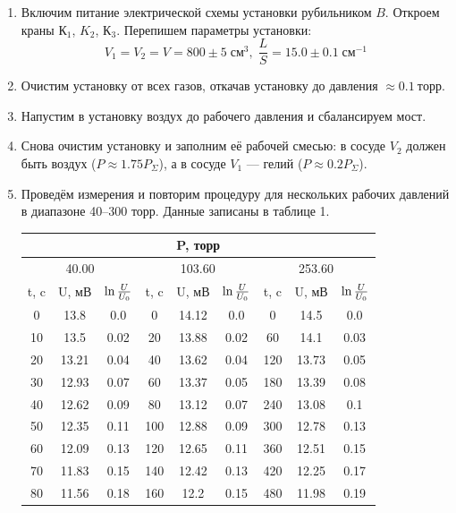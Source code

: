 \documentclass[12pt,a4paper]{article}
\begin{document}
\begin{enumerate}
\item Включим питание электрической схемы установки рубильником $B$. Откроем краны $К_1$, $K_2$, $К_3$. Перепишем параметры установки: $$V_1 = V_2 = V = 800 \pm 5 \; см^{3}, \; \frac{L}{S} = 15.0 \pm 0.1 \;см^{-1}$$
\item Очистим установку от всех газов, откачав установку до давления $\approx 0.1\ торр $.
\item Напустим в установку воздух до рабочего давления и сбалансируем мост. 
\item Снова очистим установку и заполним её рабочей смесью: в сосуде $V_2$ должен быть воздух ($P \approx 1.75P_\Sigma$), а в сосуде $V_1$ — гелий ($P \approx 0.2 P_\Sigma$).
\item Проведём измерения и повторим процедуру для нескольких рабочих давлений в диапазоне 40--300 торр. Данные записаны в таблице 1.
\begin{table}[htp]
	\centering
	\begin{tabular}{|c|c|c||c|c|c||c|c|c|}
		\hline
		\multicolumn{9}{|c|}{P, торр}\\
		\hline
		\multicolumn{3}{|c||}{40.00} & \multicolumn{3}{|c||}{103.60} & \multicolumn{3}{|c|}{253.60}\\
		\hline
		t, c & U, мВ&$\ln{U\over U_0}$&t, c & U, мВ&$\ln{U\over U_0}$&t, c & U, мВ&$\ln{U\over U_0}$\\
		\hline
		0  &  13.8  &  0.0  &  0  &  14.12  &  0.0  &  0  &  14.5  &  0.0 \\ 
		\hline
	   10  &  13.5  &  0.02  &  20  &  13.88  &  0.02  &  60  &  14.1  &  0.03 \\ 
		\hline
	   20  &  13.21  &  0.04  &  40  &  13.62  &  0.04  &  120  &  13.73  &  0.05 \\ 
		\hline
	   30  &  12.93  &  0.07  &  60  &  13.37  &  0.05  &  180  &  13.39  &  0.08 \\ 
		\hline
	   40  &  12.62  &  0.09  &  80  &  13.12  &  0.07  &  240  &  13.08  &  0.1 \\ 
		\hline
	   50  &  12.35  &  0.11  &  100  &  12.88  &  0.09  &  300  &  12.78  &  0.13 \\ 
		\hline
	   60  &  12.09  &  0.13  &  120  &  12.65  &  0.11  &  360  &  12.51  &  0.15 \\ 
		\hline
	   70  &  11.83  &  0.15  &  140  &  12.42  &  0.13  &  420  &  12.25  &  0.17 \\ 
		\hline
	   80  &  11.56  &  0.18  &  160  &  12.2  &  0.15  &  480  &  11.98  &  0.19 \\ 

\end{tabular}
\end{table}
\end{enumerate}
\end{document}
